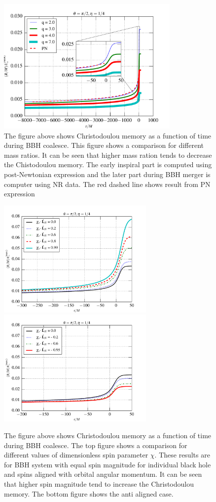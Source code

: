 \documentclass[twocolumn,showpacs,aps,prd,nobibnotes,floatfix]{revtex4-1}
\begin{document}
\begin{figure}
 	\includegraphics[width=3.5in]{../plots/MemoryPlot_nonSpining/q7.pdf}
 	\caption{The figure above shows Christodoulou memory as a function of time during BBH coalesce. This figure shows a comparison for different mass ratios. It can be seen that higher mass ration tends to decrease the Chistodoulou memory. The early inspiral part is computed using post-Newtonian expression and the later part during BBH merger is computer using NR data. The red dashed line shows result from PN expression}
 	\label{fig:differentmassratio}
\end{figure}
\begin{figure}
	\includegraphics[width=3.0in]{../plots/MemoryPlot_AlignedSpinSXSdata/0p99.pdf}
	\includegraphics[width=3.0in]{../plots/MemoryPlot_AntialignedSpinSXSdata/m0p94.pdf}
	\caption{The figure above shows Christodoulou memory as a function of time during BBH coalesce. The top figure shows a comparison for different values of dimensionless spin parameter $\chi$. These results are for BBH system with equal spin magnitude for individual black hole and spins aligned with orbital angular momentum. It can be seen that higher spin magnitude tend to increase the Christodoulou memory. The bottom figure shows the anti aligned case.  }
	\label{fig:differntchivalues}
\end{figure}
\end{document}
